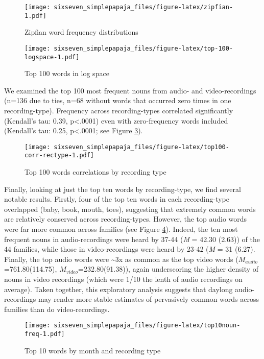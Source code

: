 \documentclass[floatsintext,man]{apa6}
\theoremstyle{definition}
\theoremstyle{definition}
\theoremstyle{definition}
\theoremstyle{remark}
\begin{document}
\begin{figure}
\centering
\texttt{[image: sixseven\_simplepapaja\_files/figure-latex/zipfian-1.pdf]}
\caption{\label{fig:zipfian}Zipfian word frequency distributions}
\end{figure}

\begin{figure}
\centering
\texttt{[image: sixseven\_simplepapaja\_files/figure-latex/top-100-logspace-1.pdf]}
\caption{\label{fig:top-100-logspace}Top 100 words in log space}
\end{figure}

We examined the top 100 most frequent nouns from audio- and
video-recordings (n=136 due to ties, n=68 without words that occurred
zero times in one recording-type). Frequency across recording-types
correlated significantly (Kendall's tau: 0.39, p\textless{}.0001) even
with zero-frequency words included (Kendall's tau: 0.25,
p\textless{}.0001; see Figure \ref{fig:top100-corr-rectype}).

\begin{figure}
\centering
\texttt{[image: sixseven\_simplepapaja\_files/figure-latex/top100-corr-rectype-1.pdf]}
\caption{\label{fig:top100-corr-rectype}Top 100 words correlations by
recording type}
\end{figure}

Finally, looking at just the top ten words by recording-type, we find
several notable results. Firstly, four of the top ten words in each
recording-type overlapped (baby, book, mouth, toes), suggesting that
extremely common words are relatively conserved across recording-types.
However, the top audio words were far more common across families (see
Figure \ref{fig:top10noun-freq}). Indeed, the ten most frequent nouns in
audio-recordings were heard by 37-44 (\emph{M} = 42.30 (2.63)) of the 44
families, while those in video-recordings were heard by 23-42 (\emph{M}
= 31 (6.27). Finally, the top audio words were \textasciitilde{}3x as
common as the top video words (\(M_{audio}\)=761.80(114.75),
\(M_{video}\)=232.80(91.38)), again underscoring the higher density of
nouns in video recordings (which were 1/10 the lenth of audio recordings
on average). Taken together, this exploratory analysis suggests that
daylong audio-recordings may render more stable estimates of pervasively
common words across families than do video-recordings.

\begin{figure}
\centering
\texttt{[image: sixseven\_simplepapaja\_files/figure-latex/top10noun-freq-1.pdf]}
\caption{\label{fig:top10noun-freq}Top 10 words by month and recording type}
\end{figure}
\end{document}
